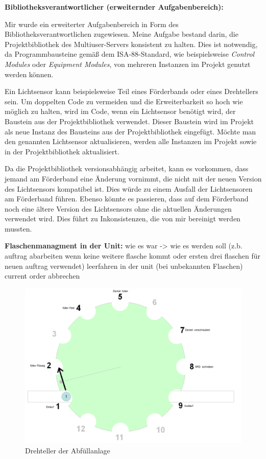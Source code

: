 \textbf{Bibliotheksverantwortlicher (erweiternder Aufgabenbereich):} 

Mir wurde ein erweiterter Aufgabenbereich in Form des Bibliotheksverantwortlichen zugewiesen. Meine Aufgabe bestand darin, 
die Projektbibliothek des Multiuser-Servers konsistent zu halten. Dies ist notwendig, da Programmbausteine gemäß dem 
ISA-88-Standard, wie beispielsweise \textit{Control Modules} oder \textit{Equipment Modules}, von mehreren Instanzen im 
Projekt genutzt werden können.

Ein Lichtsensor kann beispielsweise Teil eines Förderbands oder eines Drehtellers sein. Um doppelten Code zu vermeiden und 
die Erweiterbarkeit so hoch wie möglich zu halten, wird im Code, wenn ein Lichtsensor benötigt wird, der Baustein aus der 
Projektbibliothek verwendet. Dieser Baustein wird im Projekt als neue Instanz des Bausteins aus der Projektbibliothek 
eingefügt. Möchte man den genannten Lichtsensor aktualisieren, werden alle Instanzen im Projekt sowie in der 
Projektbibliothek aktualisiert.

Da die Projektbibliothek versionsabhängig arbeitet, kann es vorkommen, dass jemand am Förderband eine Änderung vornimmt, die 
nicht mit der neuen Version des Lichtsensors kompatibel ist. Dies würde zu einem Ausfall der Lichtsensoren am Förderband 
führen. Ebenso könnte es passieren, dass auf dem Förderband noch eine ältere Version des Lichtsensors ohne die aktuellen 
Änderungen verwendet wird. Dies führt zu Inkonsistenzen, die von mir bereinigt werden mussten.

\textbf{Flaschenmanagment in der Unit:} 
wie es war -> wie es werden soll (z.b. auftrag abarbeiten wenn keine weitere flasche kommt oder ersten drei flaschen für neuen auftrag verwendet)
leerfahren in der unit (bei unbekannten Flaschen)
current order abbrechen 

\begin{figure}[h!]
    \centering
    \includegraphics{figures/image.png}
    \caption{Drehteller der Abfüllanlage\cite{siemens2022}} %
    \label{Drehteller} %
\end{figure}


